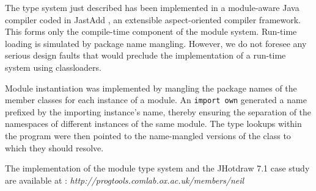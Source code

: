 The type system just described has been implemented in a
module-aware Java compiler coded in JastAdd \cite{jastadd},
an extensible aspect-oriented compiler framework. This forms
only the compile-time component of the module system. Run-time
loading is simulated by package name mangling. However,
we do not foresee any serious design faults that would preclude
the implementation of a run-time system using classloaders.

Module instantiation was implemented by mangling
the package names of the member classes for each instance of 
a module. An \texttt{import own} generated a name prefixed by 
the importing instance's name, thereby ensuring the separation
of the namespaces of different instances of the same module.
The type lookups within the program were then pointed to the
name-mangled versions of the class to which they should resolve.

The implementation of the module type system and the 
JHotdraw 7.1 case study are available at : 
\textit{http://progtools.comlab.ox.ac.uk/members/neil}










